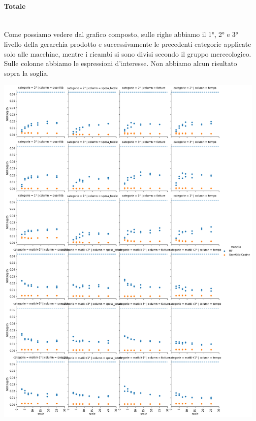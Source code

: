 \paragraph{Totale}\mbox{} \\
Come possiamo vedere dal grafico composto, sulle righe abbiamo il 1°, 2° e 3° livello della gerarchia prodotto e successivamente le precedenti categorie applicate solo alle macchine, mentre i ricambi si sono divisi secondo il gruppo merceologico. Sulle colonne abbiamo le espressioni d'interesse. Non abbiamo alcun risultato sopra la soglia.
\begin{center}
\includegraphics[width=14.5cm]{figures/risultati_minmax_categoria_totale.png}
\label{tab:minmax_totale}
\end{center}

